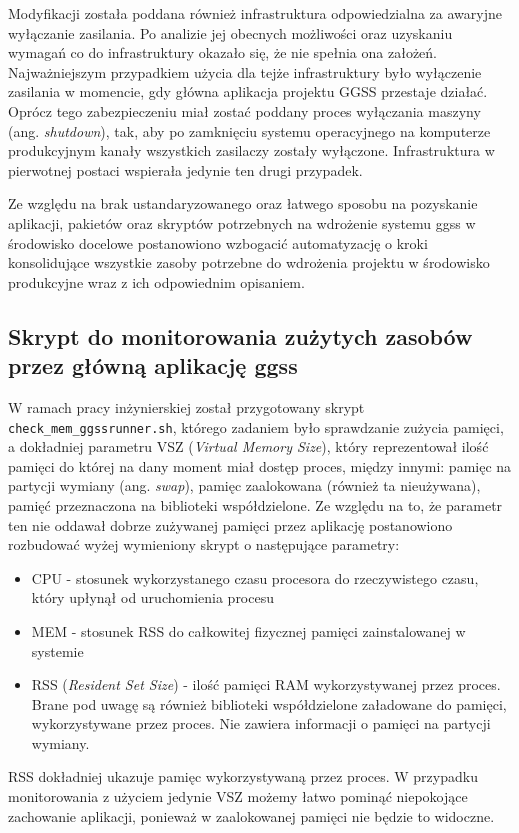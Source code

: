 Modyfikacji została poddana również infrastruktura odpowiedzialna za awaryjne wyłączanie zasilania. Po analizie jej obecnych możliwości oraz uzyskaniu wymagań co do infrastruktury okazało się, że nie spełnia ona założeń. Najważniejszym przypadkiem użycia dla tejże infrastruktury było wyłączenie zasilania w momencie, gdy główna aplikacja projektu GGSS przestaje działać. Oprócz tego zabezpieczeniu miał zostać poddany proces wyłączania maszyny (ang. \emph{shutdown}), tak, aby po zamknięciu systemu operacyjnego na komputerze produkcyjnym kanały wszystkich zasilaczy zostały wyłączone. Infrastruktura w pierwotnej postaci wspierała jedynie ten drugi przypadek.

Ze względu na brak ustandaryzowanego oraz łatwego sposobu na pozyskanie aplikacji, pakietów oraz skryptów potrzebnych na wdrożenie systemu ggss w środowisko docelowe postanowiono wzbogacić automatyzację o kroki konsolidujące wszystkie zasoby potrzebne do wdrożenia projektu w środowisko produkcyjne wraz z ich odpowiednim opisaniem.

\subsection{Skrypt do monitorowania zużytych zasobów przez główną aplikację ggss}

W ramach pracy inżynierskiej został przygotowany skrypt \lstinline{check_mem_ggssrunner.sh}, którego zadaniem było sprawdzanie zużycia pamięci, a dokładniej parametru VSZ (\emph{Virtual Memory Size}), który reprezentował ilość pamięci do której na dany moment miał dostęp proces, między innymi: pamięc na partycji wymiany (ang. \emph{swap}), pamięc zaalokowana (również ta nieużywana), pamięć przeznaczona na biblioteki współdzielone. Ze względu na to, że parametr ten nie oddawał dobrze zużywanej pamięci przez aplikację postanowiono rozbudować wyżej wymieniony skrypt o następujące parametry:
\begin{itemize}
    \item CPU - stosunek wykorzystanego czasu procesora do rzeczywistego czasu, który upłynął od uruchomienia procesu
    \item MEM - stosunek RSS do całkowitej fizycznej pamięci zainstalowanej w systemie
    \item RSS (\emph{Resident Set Size}) - ilość pamięci RAM wykorzystywanej przez proces. Brane pod uwagę są również biblioteki współdzielone załadowane do pamięci, wykorzystywane przez proces. Nie zawiera informacji o pamięci na partycji wymiany. \cite{rssvsz}
\end{itemize}
RSS dokładniej ukazuje pamięc wykorzystywaną przez proces. W przypadku monitorowania z użyciem jedynie VSZ możemy łatwo pominąć niepokojące zachowanie aplikacji, ponieważ w zaalokowanej pamięci nie będzie to widoczne.


